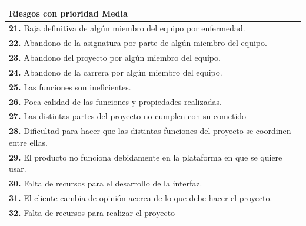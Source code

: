 \documentclass[spanish,a4paper,11pt, twoside]{report}	%
\begin{document}
			\begin{tabular}{|p{12cm}|}
				\hline
				\textbf{Riesgos con prioridad Media}\\ \hline \hline
				\textbf{21.} Baja definitiva de algún miembro del equipo por enfermedad.\\ \hline 
				\textbf{22.} Abandono de la asignatura por parte de algún miembro del equipo.\\ \hline
				\textbf{23.} Abandono del proyecto por algún miembro del equipo. \\ \hline
				\textbf{24.} Abandono de la carrera por algún miembro del equipo. \\ \hline
				\textbf{25.} Las funciones son ineficientes.\\ \hline
				\textbf{26.} Poca calidad de las funciones y propiedades realizadas. \\ \hline
				\textbf{27.} Las distintas partes del proyecto no cumplen con su cometido \\ \hline
				\textbf{28.} Dificultad para hacer que las distintas funciones del proyecto se coordinen entre ellas. \\ \hline
				\textbf{29.} El producto no funciona debidamente en la plataforma en que se quiere usar. \\ \hline
				\textbf{30.} Falta de recursos para el desarrollo de la interfaz. \\ \hline
				\textbf{31.} El cliente cambia de opinión acerca de lo que debe hacer el proyecto. \\ \hline
				\textbf{32.} Falta de recursos para realizar el proyecto \\ \hline
			\end{tabular}
			
				\ \\
				\ \\
			
\end{document}
